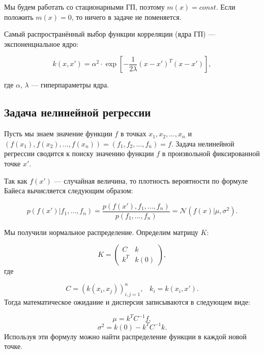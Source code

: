\documentclass[a4paper,14pt]{extarticle}
\begin{document}
		Мы будем работать со стационарными ГП, поэтому $m(x) = const$. Если положить $m(x) = 0$, то ничего в задаче не поменяется. 
		
		Самый распространённый выбор функции корреляции (ядра ГП) --- экспоненциальное ядро: 
		
		$$ k(x, x') = \alpha^2  \cdot \exp\left[-\frac{1}{2 \lambda} (x-x')^T(x-x')\right],$$

		где $\alpha$, $\lambda$ --- гиперпараметры ядра.
		
		\subsection{Задача нелинейной регрессии}
		Пусть мы знаем значение функции $f$ в точках $x_1, x_2,  \ldots, x_n$ и \\ $(f(x_1), f(x_2), \ldots, f(x_n)) =  (f_1, f_2, \ldots, f_n) = f$. Задача нелинейной регрессии сводится к поиску значению функции $f$ в произвольной фиксированной точке $x'$. 
		
		Так как $f(x')$ ---  случайная величина, то плотность вероятности по формуле Байеса вычисляется следующим образом: 
		
		$$ p(f(x') | f_1, \ldots, f_n) = \frac{p(f(x'), f_1, \ldots, f_n)}{p(f_1, \ldots, f_n)} = {\mathcal {N}}(f(x) | \mu ,\sigma ^{2}).$$

		Мы получили нормальное распределение. Определим матрицу $K$:
		
		$$K = \begin{pmatrix} C & k \\ k^T & k(0)\end{pmatrix},$$
		где 
		
		$$C = (k(x_i, x_j))_{i, j = 1}^n, \; \; \; k_i = k(x_i, x').$$
		 Тогда математическое ожидание и дисперсия записываются в следующем виде: 
		 
		 $$\mu = k^TC^{-1}f,$$	
		 $$ \sigma^2 = k(0) - k^TC^{-1}k.$$
		 Используя эти формулу можно найти распределение функции в каждой новой точке. 
		 
\end{document}
